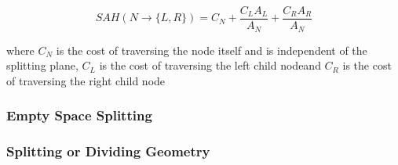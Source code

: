 

\begin{displaymath}
  SAH(N \rightarrow \{L, R\}) = C_N + \frac{C_L A_L}{A_N} +
  \frac{C_R A_R}{A_N}
\end{displaymath}

where $C_N$ is the cost of traversing the node itself and is
independent of the splitting plane, $C_L$ is the cost of traversing
the left child nodeand $C_R$ is the cost of traversing the right child
node




\subsubsection{Empty Space Splitting}

\subsubsection{Splitting or Dividing Geometry}









